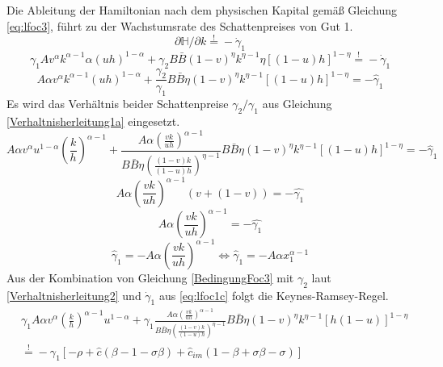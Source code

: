 Die Ableitung der Hamiltonian nach dem physischen Kapital gemä{\ss} Gleichung \eqref{eq:lfoc3}, führt zu der Wachstumsrate des Schattenpreises von Gut 1.
\begin{equation*}
\partial\mathbb{H}/\partial k\overset{!}{=}-\dot{\gamma}_1
\end{equation*}
\vspace{-0.2cm}
\begin{equation}
\gamma_{1}A v^{\alpha}k^{\alpha -1} \alpha(u h)^{1- \alpha} + \gamma_{2}B\bar{B}(1- v)^{\eta} k^{\eta -1} \eta \left [ (1-u)h \right ]^{1- \eta}\overset{!}{=} - \dot{\gamma}_{1}\label{BedingungFoc3}
\end{equation}
\begin{equation*}
 A \alpha v^{\alpha}k^{\alpha -1} (uh)^{1- \alpha} + \frac{\gamma_{2}}{\gamma_{1}}B\bar{B}\eta (1- v)^{\eta} k^{\eta -1} \left [(1-u)h \right ]^{1- \eta}= - \hat{\gamma}_{1}
\end{equation*}
Es wird das Verhältnis beider Schattenpreise $\gamma_2/\gamma_1$ aus Gleichung \eqref{Verhaltnisherleitung1a} eingesetzt.
\begin{equation*}
 A \alpha v^{\alpha} {u}^{1- \alpha} \left(\frac{k}{h}\right)^{\alpha -1}+ \frac{A\alpha \left(\frac{vk}{uh}\right)^{\alpha-1}}{B\bar{B}\eta\left(\frac{(1-v)k}{(1-u)h}\right)^{\eta-1}}B\bar{B}\eta (1- v)^{\eta} k^{\eta -1} \left [(1-u)h \right ]^{1- \eta}= - \hat{\gamma}_{1}
\end{equation*}
\begin{equation*}
 A \alpha \left(\frac{vk}{uh}\right)^{\alpha -1}(v+ (1- v))= -\hat{\gamma_{1}}
\end{equation*}
\begin{equation*}
 A \alpha \left(\frac{vk}{uh}\right)^{\alpha -1} = - \hat{\gamma_{1}}
\end{equation*}
\begin{equation}
\hat{\gamma}_1=-A\alpha \left(\frac{vk}{uh}\right)^{\alpha-1}\Longleftrightarrow \hat{\gamma}_1=-A\alpha x_1^{\alpha-1}\label{foc3}
\end{equation}
Aus der Kombination von Gleichung \eqref{BedingungFoc3} mit $\gamma_2$ laut \eqref{Verhaltnisherleitung2} und $\dot{\gamma}_1$ aus \eqref{eq:lfoc1c} folgt die Keynes-Ramsey-Regel.
\begin{equation}
\begin{split}
&\gamma_{1}A \alpha v^{\alpha} \left(\frac{k}{h}\right)^{\alpha -1} u^{1- \alpha}+\gamma_1\frac{A\alpha \left(\frac{vk}{uh}\right)^{\alpha-1}}{B\bar{B}\eta\left(\frac{(1-v)k}{(1-u)h}\right)^{\eta-1}}{B\bar{B}\eta (1- v)^{\eta} k^{\eta-1} \left [ h(1-u) \right ]^{1- \eta}}\\
&\overset{!}{=} - \gamma_{1}\left [ - \rho + \hat{c} (\beta -1 - \sigma \beta)+\hat{c}_{im}(1- \beta + \sigma \beta - \sigma) \right ]
\end{split}
\end{equation}

